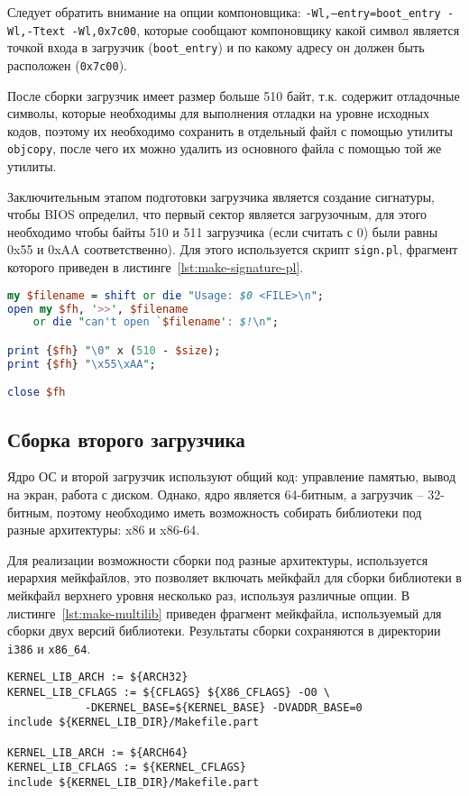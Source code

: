 Следует обратить внимание на опции компоновщика: \texttt{-Wl,--entry=boot\_entry -Wl,-Ttext -Wl,0x7c00},
которые сообщают компоновщику какой символ является точкой входа в загрузчик (\texttt{boot\_entry}) и по
какому адресу он должен быть расположен (\texttt{0x7c00}).

После сборки загрузчик имеет размер больше 510 байт, т.к. содержит отладочные символы, которые
необходимы для выполнения отладки на уровне исходных кодов, поэтому их необходимо сохранить
в отдельный файл с помощью утилиты \texttt{objcopy}, после чего их можно удалить из основного файла
с помощью той же утилиты.

Заключительным этапом подготовки загрузчика является создание сигнатуры, чтобы BIOS определил, что
первый сектор является загрузочным, для этого необходимо чтобы байты 510 и 511 загрузчика (если считать с 0)
были равны 0x55 и 0xAA соответственно). Для этого используется скрипт \texttt{sign.pl}, фрагмент
которого приведен в листинге~\ref{lst:make-signature-pl}.

\begin{lstlisting}[language=Perl, caption={Фрагмент скрипта для создания сигнатуры}, label={lst:make-signature-pl}]
my $filename = shift or die "Usage: $0 <FILE>\n";
open my $fh, '>>', $filename
	or die "can't open `$filename': $!\n";

print {$fh} "\0" x (510 - $size);
print {$fh} "\x55\xAA";

close $fh
\end{lstlisting}

\subsection{Сборка второго загрузчика}
Ядро ОС и второй загрузчик используют общий код: управление памятью, вывод на экран,
работа с диском. Однако, ядро является 64-битным, а загрузчик -- 32-битным, поэтому
необходимо иметь возможность собирать библиотеки под разные архитектуры: x86 и x86-64.

Для реализации возможности сборки под разные архитектуры, используется иерархия мейкфайлов,
это позволяет включать мейкфайл для сборки библиотеки в мейкфайл верхнего уровня несколько
раз, используя различные опции. В листинге~\ref{lst:make-multilib} приведен фрагмент мейкфайла, используемый
для сборки двух версий библиотеки. Результаты сборки сохраняются в директории \texttt{i386} и \texttt{x86\_64}.

\begin{lstlisting}[language=Make, caption={Фрагмент мейкфайла для сборки библиотек}, label={lst:make-multilib}]
KERNEL_LIB_ARCH := ${ARCH32}
KERNEL_LIB_CFLAGS := ${CFLAGS} ${X86_CFLAGS} -O0 \
		    -DKERNEL_BASE=${KERNEL_BASE} -DVADDR_BASE=0
include ${KERNEL_LIB_DIR}/Makefile.part

KERNEL_LIB_ARCH := ${ARCH64}
KERNEL_LIB_CFLAGS := ${KERNEL_CFLAGS}
include ${KERNEL_LIB_DIR}/Makefile.part
\end{lstlisting}

